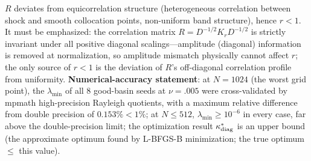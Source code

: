 \documentclass[11pt]{article}
\numberwithin{equation}{section}
\begin{document}
$R$ deviates from equicorrelation structure (heterogeneous correlation between shock and smooth collocation points, non-uniform band structure), hence $r<1$. It must be emphasized: the correlation matrix $R=D^{-1/2}K_rD^{-1/2}$ is strictly invariant under all positive diagonal scalings---amplitude (diagonal) information is removed at normalization, so amplitude mismatch physically cannot affect $r$; the only source of $r<1$ is the deviation of $R$'s off-diagonal correlation profile from uniformity. \textbf{Numerical-accuracy statement}: at $N=1024$ (the worst grid point), the $\lambda_{\min}$ of all 8 good-basin seeds at $\nu=.005$ were cross-validated by mpmath high-precision Rayleigh quotients, with a maximum relative difference from double precision of $0.153\%<1\%$; at $N\le512$, $\lambda_{\min}\ge10^{-6}$ in every case, far above the double-precision limit; the optimization result $\kappa^*_{\rm diag}$ is an upper bound (the approximate optimum found by L-BFGS-B minimization; the true optimum $\le$ this value).
\end{document}
